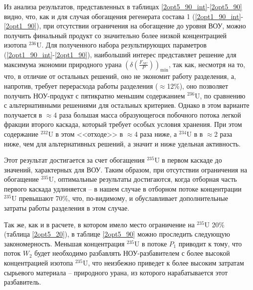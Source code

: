 Из анализа результатов, представленных в таблицах \ref{2opt5_90_int}-\ref{2opt5_90} видно, что, как и для случая обогащения регенерата состава 1 (\ref{2opt1_90_int}-\ref{2opt1_90}), при отсутствии ограничения на обогащение до уровня ВОУ, можно получить финальный продукт со значительно более низкой концентрацией изотопа $^{236}$U. Для полученного набора результирующих параметров (\ref{2opt1_90_int}-\ref{2opt1_90}), наибольший интерес представляет решение для максимума экономии природного урана $(\delta(\frac{F_{NU}}{P}))_\text{min}$, так как, несмотря на то, что, в отличие от остальных решений, оно не экономит работу разделения, а, напротив, требует перерасхода работы разделения ($\approx$12\%), оно позволяет получить НОУ-продукт с пятикратно меньшим содержанием $^{236}$U, по сравнению с альтернативными решениями для остальных критериев. Однако в этом варианте получается в $\approx$4 раза большая масса образующегося побочного потока легкой фракции второго каскада, который требует особых условия хранения. При этом содержание $^{232}$U в этом <<отходе>> в $\approx$4 раза ниже, а $^{234}$U в в $\approx$2 раза ниже, чем для альтернативных решений, а значит и ниже удельная активность.

Этот результат достигается за счет обогащения $^{235}$U в первом каскаде до значений, характерных для ВОУ. Таким образом, при отсутствии ограничения на обогащение $^{235}$U, оптимальные результаты достигаются, когда отборная часть первого каскада удлиняется -- в нашем случае в отборном потоке концентрации $^{235}$U превышают 70\%, что, по-видимому, и обуславливает дополнительные затраты работы разделения в этом случае.

Так же, как и в расчете, в котором имело место ограничение на $^{235}$U 20\% (таблица \ref{2opt5_20}), в таблице \ref{2opt5_90} можно проследить следующую закономерность. Меньшая концентрация $^{235}$U в потоке $P_{1}$ приводит к тому, что поток $W_{2}$ будет необходимо разбавлять НОУ-разбавителем с более высокой концентрацией изотопа $^{235}$U, что неизбежно приведет к более высоким затратам сырьевого материала -- природного урана, из которого нарабатывается этот разбавитель.


